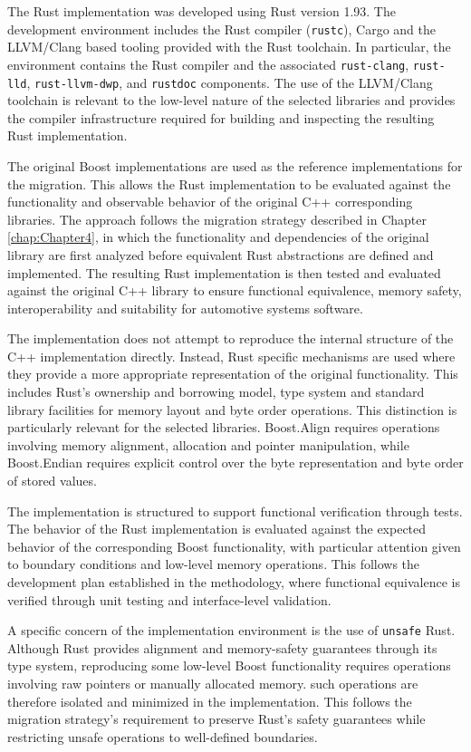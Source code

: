 The Rust implementation was developed using Rust version 1.93. The development environment includes the Rust compiler
(\texttt{rustc}), Cargo and the LLVM/Clang based tooling provided with the Rust toolchain. In particular, 
the environment contains the Rust compiler and the associated \texttt{rust-clang}, \texttt{rust-lld}, 
\texttt{rust-llvm-dwp}, and \texttt{rustdoc} components. The use of the LLVM/Clang toolchain is relevant to the low-level 
nature of the selected libraries and provides the compiler infrastructure required for building and 
inspecting the resulting Rust implementation.

The original Boost implementations are used as the reference implementations for the migration. This allows the Rust 
implementation to be evaluated against the functionality and observable behavior of the original C++ corresponding libraries.
The approach follows the migration strategy described in Chapter \ref{chap:Chapter4}, in which the functionality and dependencies
of the original library are first analyzed before equivalent Rust abstractions are defined and implemented. 
The resulting Rust implementation is then tested and evaluated against the original C++ library to ensure functional equivalence,
memory safety, interoperability and suitability for automotive systems software.

The implementation does not attempt to reproduce the internal structure of the C++ implementation directly. Instead, Rust specific
mechanisms are used where they provide a more appropriate representation of the original functionality. This includes Rust's ownership
and borrowing model, type system and standard library facilities for memory layout and byte order operations.
This distinction is particularly relevant for the selected libraries. Boost.Align requires operations involving memory alignment, 
allocation and pointer manipulation, while Boost.Endian requires explicit control over the byte representation and byte order of stored values.

The implementation is structured to support functional verification through tests. 
The behavior of the Rust implementation is evaluated against the expected behavior of the corresponding Boost functionality, 
with particular attention given to boundary conditions and low-level memory operations.
This follows the development plan established in the methodology, where functional equivalence is verified through 
unit testing and interface-level validation.

A specific concern of the implementation environment is the use of \texttt{unsafe} Rust. 
Although Rust provides alignment and memory-safety guarantees through its type system, 
reproducing some low-level Boost functionality requires operations involving raw pointers or manually allocated memory. 
such operations are therefore isolated and minimized in the implementation. This follows the migration strategy's requirement to
preserve Rust's safety guarantees while restricting unsafe operations to well-defined boundaries.

